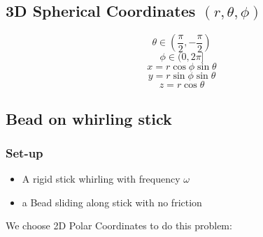 \documentclass{article}
\newtheorem{one minute paper}[theorem]{One Minute Paper}
\begin{document}
\subsection*{3D Spherical Coordinates $(r, \theta, \phi)$}

\begin{equation}
    \theta \in (\frac{\pi}{2}, -\frac{\pi}{2})
\end{equation}
\begin{equation}
    \phi \in (0, 2\pi]
\end{equation}
\begin{equation}
    x = r\cos\phi \sin\theta
\end{equation}
\begin{equation}
    y = r\sin\phi\sin\theta
\end{equation}
\begin{equation}
    z = r\cos\theta
\end{equation}

\subsection*{Bead on whirling stick}

\subsubsection*{Set-up}
\begin{itemize}
    \item A rigid stick whirling with frequency $\omega$
    \item a Bead sliding along stick with no friction
\end{itemize}

We choose 2D Polar Coordinates to do this problem:
\end{document}

